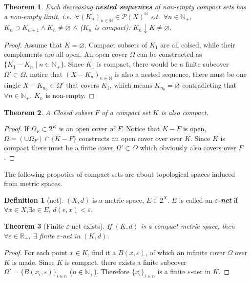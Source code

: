\documentclass[openany]{book}
\newcommand*{\indexbf}[1]{\emph{\textbf{#1}}\index{#1}} %
\theoremstyle{plain}
\newtheorem{theorem}{Theorem}[section] %
\theoremstyle{definition}
\newtheorem{definition}{Definition}[section] %
\begin{document}
\begin{theorem}\label{theorem: compact nested sequences have non-empty limit}
	Each decreasing \emph{\textbf{nested sequences}} of non-empty compact sets has a non-empty limit, i.e.\ 
	$\forall (K_n)_{n \in \mathbb N} \in \mathscr P(X)^\mathbb N$ s.t.\ $\forall n \in \mathbb N_+$, $K_n \supset K_{n+1}\wedge K_n \neq \varnothing$ $\wedge$ ($K_n$ is compact): 
	$K_n \downarrow K \neq \varnothing$.
\end{theorem}
\begin{proof}
	Assume that $K = \varnothing$. 
	Compact subsets of $K_1$ are all colsed, while their complements are all open. An open cover $\varOmega$ can be constructed as $\{K_1 - K_n \mid n \in \mathbb N_+\}$. 
	Since $K_1$ is compact, there would be a finite subcover $\varOmega' \subset \varOmega$, notice that $(X - K_n)_{n \in \mathbb N}$ is also a nested sequence, there must be one single $X - K_{n_0} \in \varOmega'$ that covers $K_1$, which means $K_{n_0} = \varnothing$ contradicting that $\forall n \in \mathbb N_+$, $K_n$ is non-empty.
\end{proof}

\begin{theorem}\label{theorem: closed subset of compact set}
	A Closed subset $F$ of a compact set $K$ is also compact.
\end{theorem}
\begin{proof}
	If $\varOmega_F \subset 2^K$ is an open cover of $F$. 
	Notice that $K - F$ is open, $\varOmega = (\cup \varOmega_F) \cap \{K - F\}$ constructs an open cover over over $K$. 
	Since $K$ is compact there must be a finite cover $\varOmega' \subset \varOmega$ which obviously also covers over $F$.
\end{proof}

The following propoties of compact sets are about topological spaces induced from metric spaces.

\begin{definition}[net]\label{defintion: e-net}
	$(X, d)$ is a metric space, $E \in 2^X$. 
	$E$ is called an \indexbf{$\varepsilon$-net} if $\forall x \in X$,$\exists e \in E$, $d(e, x) < \varepsilon$.
\end{definition}

\begin{theorem}[Finite $\varepsilon$-net exists]\label{theorem: finite e-net exists (metric, compact)}
	If $(K, d)$ is a compact metric space, then $\forall \varepsilon \in \mathbb R_+$, $\exists$ \emph{finite} $\varepsilon$-net in $(K, d)$. 
\end{theorem}
\begin{proof}
	For each point $x\in K$, find it a $B(x,\varepsilon)$, of which an infinite cover $\Omega$ over $K$ is made. 
	Since $K$ is compact, there exists a finite subcover $\varOmega' = \{B(x_i,\varepsilon)\}_{i \in n}$ ($n \in \mathbb N_+$). Therefore $\{x_i\}_{i \in n}$ is a finite $\varepsilon$-net in $K$.
\end{proof}
\end{document}
